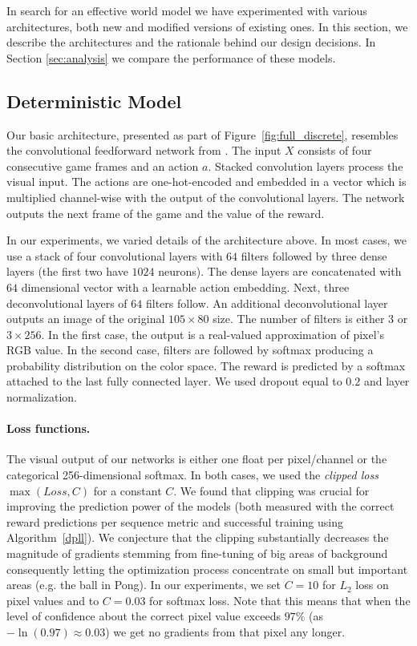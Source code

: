 In search for an effective world model we have experimented with various architectures, both new and modified versions of existing ones. In this section, we describe the architectures and the rationale behind our design decisions.  In Section \ref{sec:analysis} we compare the performance of these models.



\subsection{Deterministic Model}
Our basic architecture, presented as part of Figure~\ref{fig:full_discrete}, resembles the convolutional feedforward network from \citet{video_prediction}.  The input $X$ consists of four consecutive game frames and an action $a$. Stacked convolution layers process the visual input. The actions are one-hot-encoded and embedded in a vector which is multiplied channel-wise with the output of the convolutional layers. 
The network outputs the next frame of the game and the value of the reward.%

In our experiments, we varied details of the architecture above. In most cases, we use a stack of four convolutional layers with $64$ filters followed by three dense layers (the first two have $1024$ neurons). The dense layers are concatenated with $64$ dimensional vector with a learnable action embedding. Next, three deconvolutional layers of $64$ filters follow. An additional deconvolutional layer outputs an image of the original $105\times 80$ size. The number of filters is either $3$ or $3 \times 256$. In the first case, the output is a real-valued approximation of pixel's RGB value. In the second case, filters are followed by softmax producing a probability distribution on the color space. The reward is predicted by a softmax attached to the last fully connected layer. 
We used dropout equal to $0.2$ and layer normalization. 

\paragraph{Loss functions.}
The visual output of our networks is either one float per pixel/channel or the categorical 256-dimensional softmax. In both cases, we used the \textit{clipped loss} $\max(Loss, C)$ for a constant $C$. We found that clipping was crucial for improving the prediction power of the models (both measured with the correct reward predictions per sequence metric and successful training using Algorithm~\ref{dpll}). We conjecture that the clipping substantially decreases the magnitude of gradients stemming from fine-tuning of big areas of background consequently letting the optimization process concentrate on small but important areas (e.g. the ball in Pong). In our experiments, we set $C=10$ for $L_2$ loss on pixel values and to $C=0.03$ for softmax loss.
Note that this means that when the level of confidence about the correct pixel value exceeds $97\%$  (as $-\ln(0.97) \approx 0.03$) we get no gradients from that pixel any longer.

